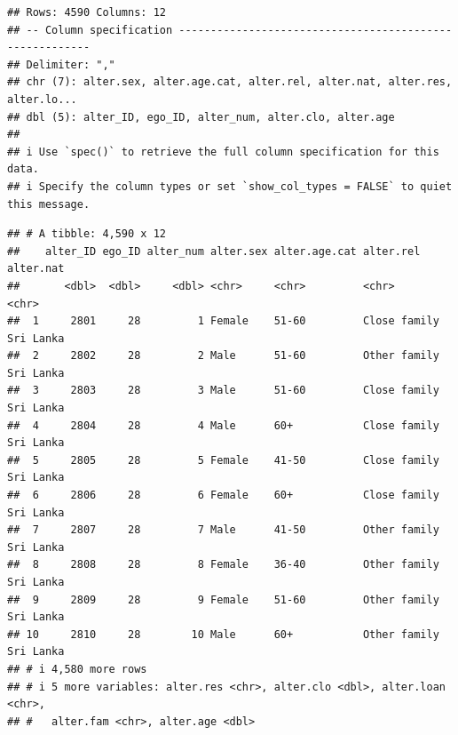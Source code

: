 \documentclass[
]{book}
\newenvironment{Shaded}{\begin{snugshade}}{\end{snugshade}}
\newcommand{\AttributeTok}[1]{\textcolor[rgb]{0.13,0.29,0.53}{#1}}
\newcommand{\CommentTok}[1]{\textcolor[rgb]{0.56,0.35,0.01}{\textit{#1}}}
\newcommand{\FunctionTok}[1]{\textcolor[rgb]{0.13,0.29,0.53}{\textbf{#1}}}
\newcommand{\NormalTok}[1]{#1}
\newcommand{\OtherTok}[1]{\textcolor[rgb]{0.56,0.35,0.01}{#1}}
\newcommand{\SpecialCharTok}[1]{\textcolor[rgb]{0.81,0.36,0.00}{\textbf{#1}}}
\begin{document}
\begin{verbatim}
## Rows: 4590 Columns: 12
## -- Column specification --------------------------------------------------------
## Delimiter: ","
## chr (7): alter.sex, alter.age.cat, alter.rel, alter.nat, alter.res, alter.lo...
## dbl (5): alter_ID, ego_ID, alter_num, alter.clo, alter.age
## 
## i Use `spec()` to retrieve the full column specification for this data.
## i Specify the column types or set `show_col_types = FALSE` to quiet this message.
\end{verbatim}

\begin{verbatim}
## # A tibble: 4,590 x 12
##    alter_ID ego_ID alter_num alter.sex alter.age.cat alter.rel    alter.nat
##       <dbl>  <dbl>     <dbl> <chr>     <chr>         <chr>        <chr>    
##  1     2801     28         1 Female    51-60         Close family Sri Lanka
##  2     2802     28         2 Male      51-60         Other family Sri Lanka
##  3     2803     28         3 Male      51-60         Close family Sri Lanka
##  4     2804     28         4 Male      60+           Close family Sri Lanka
##  5     2805     28         5 Female    41-50         Close family Sri Lanka
##  6     2806     28         6 Female    60+           Close family Sri Lanka
##  7     2807     28         7 Male      41-50         Other family Sri Lanka
##  8     2808     28         8 Female    36-40         Other family Sri Lanka
##  9     2809     28         9 Female    51-60         Other family Sri Lanka
## 10     2810     28        10 Male      60+           Other family Sri Lanka
## # i 4,580 more rows
## # i 5 more variables: alter.res <chr>, alter.clo <dbl>, alter.loan <chr>,
## #   alter.fam <chr>, alter.age <dbl>
\end{verbatim}

\begin{Shaded}
\end{Shaded}
\end{document}
